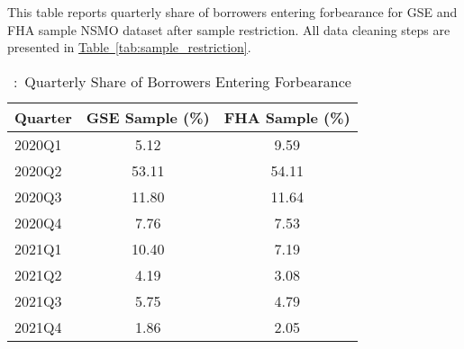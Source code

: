 \documentclass[11pt]{article}
\begin{document}
{\begin{table}[htbp]
\captionsetup{justification=justified,singlelinecheck=false}
\footnotesize
\caption{:\ Quarterly Share of Borrowers Entering Forbearance}
\label{tab:forbearance_share}
\vspace{0.5em}

\begin{minipage}{\textwidth}
\small
This table reports quarterly share of borrowers entering forbearance for GSE and FHA sample NSMO dataset after sample restriction. All data cleaning steps are presented in \hyperref[tab:sample_restriction]{Table~\ref{tab:sample_restriction}}.


\end{minipage}

\vspace{1em}
\centering
\begin{tabular}{lcc}
\toprule
\textbf{Quarter} & \textbf{GSE Sample (\%)} & \textbf{FHA Sample (\%)} \\
\midrule
2020Q1 & 5.12 & 9.59 \\
2020Q2 & 53.11 & 54.11 \\
2020Q3 & 11.80 & 11.64 \\
2020Q4 & 7.76 & 7.53 \\
2021Q1 & 10.40 & 7.19 \\
2021Q2 & 4.19 & 3.08 \\
2021Q3 & 5.75 & 4.79 \\
2021Q4 & 1.86 & 2.05 \\
\bottomrule
\end{tabular}
\end{table}




\begin{comment}
    
\begin{table}[!h]
\captionsetup{justification=justified,singlelinecheck=false}
\footnotesize
\caption{:\ Selected Variables in Semi-Penalized Lasso Logit Model}
\label{tab:survival_output}
\vspace{0.5em}

\begin{minipage}{\textwidth}
\small 

This table reports ten most frequently survived variables in a semi-penalized Lasso logit model estimated as in \hyperref[lasso]{Equation~(\ref*{lasso})}, with the dependent variable indicating mortgage refinancing. The dataset is collapsed to one observation per borrower and time-varying covariates are summarized by their average values over the pre-2020 period. Survival frequency denotes the number of times (out of 10,000 simulations) each variable was selected into the active set following penalization. All variable definitions are provided in Panel C of \hyperref[tab:description]{Table~\ref*{tab:description}}.


\end{comment}}
\end{document}
